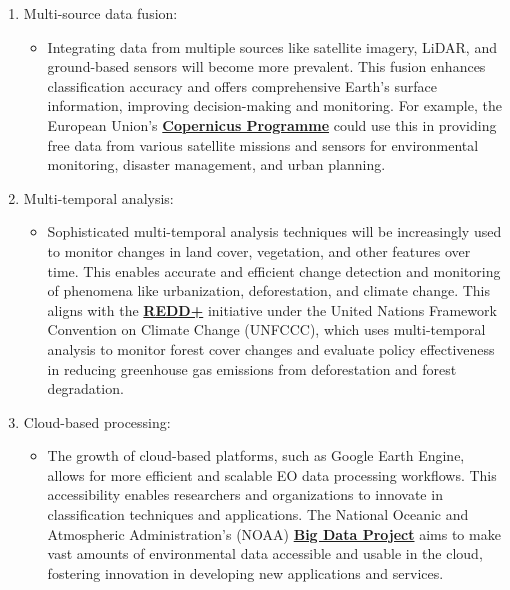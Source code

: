 \documentclass[
  letterpaper,
  DIV=11,
  numbers=noendperiod]{scrreprt}
\providecommand{\tightlist}{%
  \setlength{\itemsep}{0pt}\setlength{\parskip}{0pt}}\usepackage{longtable,booktabs,array}
\begin{document}
\begin{enumerate}
\def\labelenumi{\arabic{enumi}.}
\tightlist
\item
  Multi-source data fusion:

  \begin{itemize}
  \tightlist
  \item
    Integrating data from multiple sources like satellite imagery,
    LiDAR, and ground-based sensors will become more prevalent. This
    fusion enhances classification accuracy and offers comprehensive
    Earth's surface information, improving decision-making and
    monitoring. For example, the European Union's
    \textbf{\href{https://www.copernicus.eu/en}{Copernicus Programme}}
    could use this in providing free data from various satellite
    missions and sensors for environmental monitoring, disaster
    management, and urban planning.
  \end{itemize}
\item
  Multi-temporal analysis:

  \begin{itemize}
  \tightlist
  \item
    Sophisticated multi-temporal analysis techniques will be
    increasingly used to monitor changes in land cover, vegetation, and
    other features over time. This enables accurate and efficient change
    detection and monitoring of phenomena like urbanization,
    deforestation, and climate change. This aligns with the
    \textbf{\href{https://unfccc.int/topics/land-use/workstreams/reddplus}{REDD+}}
    initiative under the United Nations Framework Convention on Climate
    Change (UNFCCC), which uses multi-temporal analysis to monitor
    forest cover changes and evaluate policy effectiveness in reducing
    greenhouse gas emissions from deforestation and forest degradation.
  \end{itemize}
\item
  Cloud-based processing:

  \begin{itemize}
  \tightlist
  \item
    The growth of cloud-based platforms, such as Google Earth Engine,
    allows for more efficient and scalable EO data processing workflows.
    This accessibility enables researchers and organizations to innovate
    in classification techniques and applications. The National Oceanic
    and Atmospheric Administration's (NOAA)
    \textbf{\href{https://ncics.org/data/noaa-big-data-project/}{Big
    Data Project}} aims to make vast amounts of environmental data
    accessible and usable in the cloud, fostering innovation in
    developing new applications and services.
  \end{itemize}
\end{enumerate}
\end{document}
